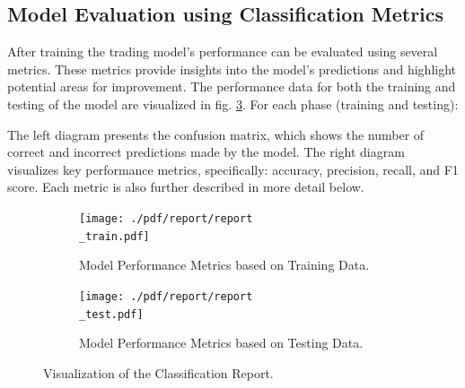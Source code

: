 \subsection{Model Evaluation using Classification Metrics}
After training the trading model's performance can be evaluated using several metrics. These metrics provide insights into the model's predictions and highlight potential areas for improvement.
The performance data for both the training and testing of the model are visualized in fig. \ref{fig:conf_matrix}.
For each phase (training and testing):

The left diagram presents the confusion matrix, which shows the number of correct and incorrect predictions made by the model.
The right diagram visualizes key performance metrics, specifically: accuracy, precision, recall, and F1 score. Each metric is also further described in  more detail below.
\begin{figure}[h]
    \centering

    \begin{subfigure}[b]{\textwidth}
        \begin{adjustbox}{max width=0.8\textwidth,center}
            \texttt{[image: ./pdf/report/report\\\_train.pdf]}
        \end{adjustbox}
        \caption{Model Performance Metrics based on Training Data.}
        \label{fig:train_perf}
    \end{subfigure}

    \bigskip %

    \begin{subfigure}[b]{\textwidth}
        \begin{adjustbox}{max width=0.8\textwidth,center}
            \texttt{[image: ./pdf/report/report\\\_test.pdf]}
        \end{adjustbox}
        \caption{Model Performance Metrics based on Testing Data.}
        \label{fig:test_perf}
    \end{subfigure}

    \caption{Visualization of the Classification Report.}
    \label{fig:conf_matrix}
\end{figure}

